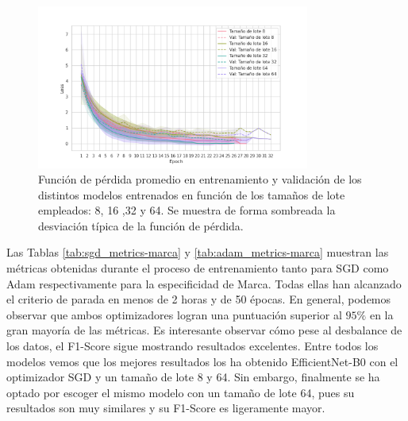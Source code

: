 \begin{figure}[H]
	\centering
	\includegraphics[width=0.8\textwidth]{img/loss-batch-marca-modelo.png}
	\caption{Función de pérdida promedio en entrenamiento y validación de los distintos modelos entrenados en función de los tamaños de lote empleados: 8, 16 ,32 y 64. Se muestra de forma sombreada la desviación típica de la función de pérdida.}
	\label{fig:loss-batch-mm}
\end{figure}

Las Tablas \ref{tab:sgd_metrics-marca} y \ref{tab:adam_metrics-marca} muestran las métricas obtenidas durante el proceso de entrenamiento tanto para SGD como Adam respectivamente para la especificidad de Marca. Todas ellas han alcanzado el criterio de parada en menos de 2 horas y de 50 épocas. En general, podemos observar que ambos optimizadores logran una puntuación superior al $95\%$ en la gran mayoría de las métricas. Es interesante observar cómo pese al desbalance de los datos, el F1-Score sigue mostrando resultados excelentes. Entre todos los modelos vemos que los mejores resultados los ha obtenido EfficientNet-B0 con el optimizador SGD y un tamaño de lote 8 y 64. Sin embargo, finalmente se ha optado por escoger el mismo modelo con un tamaño de lote 64, pues su resultados son muy similares y su F1-Score es ligeramente mayor.

